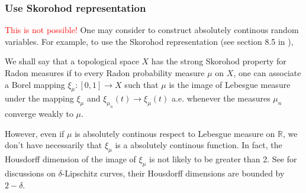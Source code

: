 
\subsubsection{Use Skorohod representation}
\textcolor{red}{This is not possible!}
One may consider to construct absolutely continous random variables.
For example, to use the Skorohod representation (see section 8.5 in \cite{Bogachev2007}),
\begin{defn}
	We shall say that a topological space \( X \) has the strong
	Skorohod property for Radon measures if to every Radon probability measure
	\( \mu \) on \( X \),
	one can associate a Borel mapping \( \xi _ { \mu } : [ 0,1 ] \rightarrow X \) such that \( \mu \) is
	the image of Lebesgue measure under the mapping \( \xi _ { \mu } \) and \( \xi _ { \mu _ { n } } ( t ) \rightarrow \xi _ { \mu } ( t ) \) a.e.
	whenever the measures \( \mu _ { n } \) converge weakly to \( \mu . \)
\end{defn}

However, even if $\mu$ is absolutely continous respect to Lebesgue measure on $\mathbb{R}$,
we don't have necessarily that $\xi_{\mu}$ is a absolutely continous function.
In fact, the Housdorff dimension of the image of $\xi_{\mu}$ is not likely to be greater than 2.
See \cite{Besicov1937Sets} for discussions on $\delta$-Lipschitz curves,
their Housdorff dimensions are bounded by $2-\delta$.

